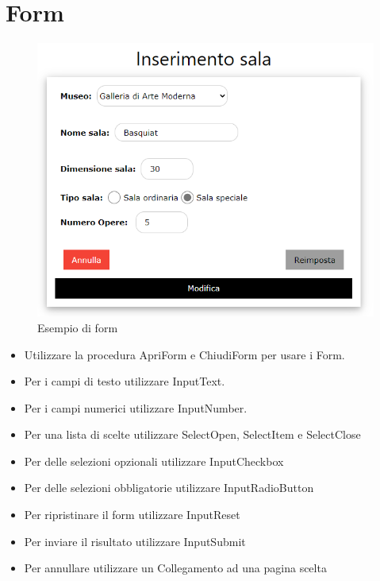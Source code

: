 \documentclass[a4paper, 12pt]{report}
\begin{document}
        \section{Form}
            \begin{figure}[httb]
                \centering
                \includegraphics[scale=0.6]{Immagini/Form.png}
                \caption{Esempio di form}
            \end{figure}
            \begin{itemize}
                \item Utilizzare la procedura ApriForm e ChiudiForm per usare i Form.
                \item Per i campi di testo utilizzare InputText.
                \item Per i campi numerici utilizzare InputNumber.
                \item Per una lista di scelte utilizzare SelectOpen, SelectItem e SelectClose
                \item Per delle selezioni opzionali utilizzare InputCheckbox 
                \item Per delle selezioni obbligatorie utilizzare InputRadioButton
                \item Per ripristinare il form utilizzare InputReset
                \item Per inviare il risultato utilizzare InputSubmit
                \item Per annullare utilizzare un Collegamento ad una pagina scelta
            \end{itemize}
        \clearpage
\end{document}
